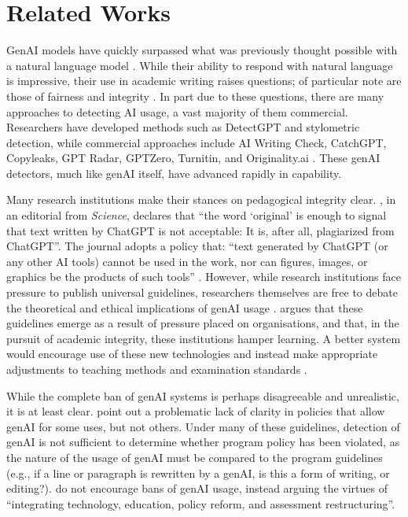 \section{Related Works}\label{sec:rw}
GenAI models have quickly surpassed what was previously thought possible with a natural language model \cite{brown_language_2020,chowdhery_palm_2022,openai_gpt-4_2023}. While their ability to respond with natural language is impressive, their use in academic writing raises questions; of particular note are those of fairness and integrity \cite{hu_challenges_2023}. In part due to these questions, there are many approaches to detecting AI usage, a vast majority of them commercial. Researchers have developed methods such as DetectGPT and stylometric detection, while commercial approaches include AI Writing Check, CatchGPT, Copyleaks, GPT Radar, GPTZero,  Turnitin, and Originality.ai \cite{mitchell_detectgpt_2023,kalpesh_krishna_paraphrasing_2023,tharindu_kumarage_stylometric_2023,gptzero_gptzero_2023,kirchner_new_2023}. These genAI detectors, much like genAI itself, have advanced rapidly in capability.

Many research institutions make their stances on pedagogical integrity clear. \textcite{h_holden_thorp_chatgpt_2023}, in an editorial from \emph{Science}, declares that ``the word `original' is enough to signal that text written by ChatGPT is not acceptable: It is, after all, plagiarized from ChatGPT''. The journal adopts a policy that: ``text generated by ChatGPT (or any other AI tools) cannot be used in the work, nor can figures, images, or graphics be the products of such tools'' \cite{h_holden_thorp_chatgpt_2023}. However, while research institutions face pressure to publish universal guidelines, researchers themselves are free to debate the theoretical and ethical implications of genAI usage \cite{lav_r_varshney_limits_2020,h_holden_thorp_chatgpt_2023,yu_huang_reflection_2023,weber-wulff_testing_2023,otterbacher_why_2023}. \textcite{yu_huang_reflection_2023} argues that these guidelines emerge as a result of pressure placed on organisations, and that, in the pursuit of academic integrity, these institutions hamper learning. A better system would encourage use of these new technologies and instead make appropriate adjustments to teaching methods and examination standards 
\cite{yu_huang_reflection_2023}. 

While the complete ban of genAI systems is perhaps disagreeable and unrealistic, it is at least clear. \textcite{MikePerkins_JasperRoe_2023} point out a problematic lack of clarity in policies that allow genAI for some uses, but not others. Under many of these guidelines, detection of genAI is not sufficient to determine whether program policy has been violated, as the nature of the usage of genAI must be compared to the program guidelines (e.g., if a line or paragraph is rewritten by a genAI, is this a form of writing, or editing?). \textcite{MikePerkins_JasperRoe_2023} do not encourage bans of genAI usage, instead arguing the virtues of ``integrating technology, education, policy reform, and assessment restructuring''.

